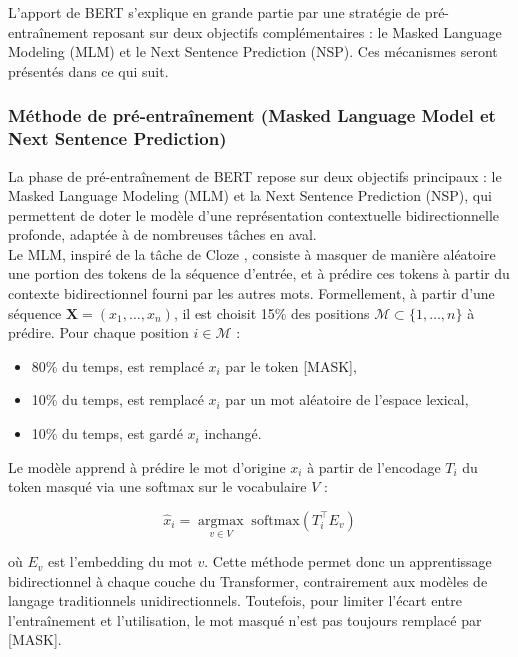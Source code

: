 L'apport de BERT s’explique en grande partie par une stratégie de pré-entraînement  reposant sur deux objectifs complémentaires : le Masked Language Modeling (MLM) et le Next Sentence Prediction (NSP). Ces mécanismes seront présentés dans ce qui suit.

\subsubsection{Méthode de pré-entraînement (Masked Language Model et Next Sentence Prediction)}

La phase de pré-entraînement de BERT repose sur deux objectifs principaux : le Masked Language Modeling (MLM) et la Next Sentence Prediction (NSP), qui permettent de doter le mod\`ele d'une représentation contextuelle bidirectionnelle profonde, adaptée à de nombreuses tâches en aval.\\

Le MLM, inspiré de la tâche de Cloze \citep{taylor1953cloze}, consiste à masquer de manière aléatoire une portion des tokens de la séquence d'entrée, et à prédire ces tokens à partir du contexte bidirectionnel fourni par les autres mots. Formellement, à partir d'une séquence $\mathbf{X} = (x_1, \dots, x_n)$, il est choisit 15\% des positions $\mathcal{M} \subset \{1, \dots, n\}$ à prédire. Pour chaque position $i \in \mathcal{M}$ :
\begin{itemize}
    \item 80\% du temps, est remplacé $x_i$ par le token [MASK],
    \item 10\% du temps, est remplacé $x_i$ par un mot aléatoire de l'espace lexical,
    \item 10\% du temps, est gardé $x_i$ inchangé.
\end{itemize}

Le mod\`ele apprend à prédire le mot d'origine $x_i$ à partir de l'encodage $T_i$ du token masqué via une softmax sur le vocabulaire $V$ :

\begin{equation}
\hat{x}_i = \operatorname*{argmax}_{v \in V} \; \mathrm{softmax}(T_i^\top E_v)
\end{equation}

o\`u $E_v$ est l'embedding du mot $v$. Cette méthode permet donc un apprentissage bidirectionnel à chaque couche du Transformer, contrairement aux modèles de langage traditionnels unidirectionnels. Toutefois, pour limiter l'écart entre l'entraînement et l'utilisation, le mot masqué n'est pas toujours remplacé par [MASK].\\

